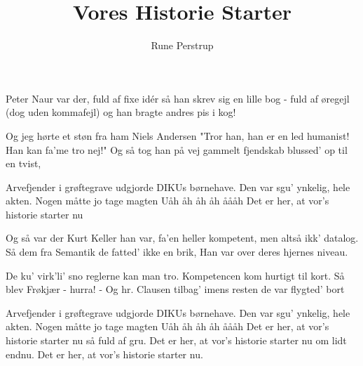 \documentclass[a4paper,11pt]{article}
\title{Vores Historie Starter}
\author{Rune Perstrup}
\begin{document}
\twocolumn[
\maketitle
]

\begin{song} 
        Peter Naur var der,
        fuld af fixe id\'er
        så han skrev sig en lille bog
        - fuld af øregejl
        (dog uden kommafejl)
        og han bragte andres pis i kog!

        Og jeg hørte et støn
        fra ham Niels Andersen
        "Tror han, han er en led humanist!
        Han kan fa'me tro nej!"
        Og så tog han på vej
        gammelt fjendskab blussed' op til en tvist,

        Arvefjender i grøftegrave
        udgjorde DIKUs børnehave.
        Den var sgu' ynkelig, hele akten.
        Nogen måtte jo tage magten     
        Uåh åh åh åh åååh 
        Det er her, at vor's historie starter nu

        Og så var der Kurt Keller
        han var, fa'en heller
        kompetent, men altså ikk' datalog.
        Så dem fra Semantik
        de fatted' ikke en brik,
        Han var over deres hjernes niveau.

        De ku' virk'li' sno
        reglerne kan man tro.
        Kompetencen kom hurtigt til kort.
        Så blev Frøkjær - hurra! -
        Og hr. Clausen tilbag'
        imens resten de var flygted' bort

        Arvefjender i grøftegrave
        udgjorde DIKUs børnehave.
        Den var sgu' ynkelig, hele akten.
        Nogen måtte jo tage magten     
        Uåh åh åh åh åååh 
        Det er her, at vor's historie starter nu
        så fuld af gru.
        Det er her, at vor's historie starter nu
        om lidt endnu. 
        Det er her, at vor's historie starter nu.
      \end{song}
    
\end{document}
